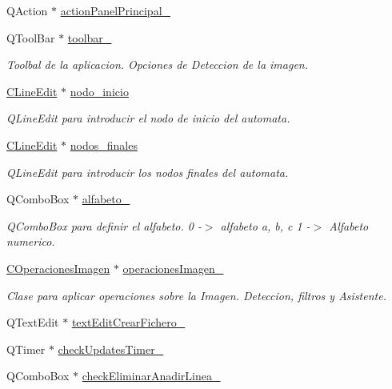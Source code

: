 \begin{DoxyCompactItemize}
Q\+Action $\ast$ \hyperlink{classCAplicacion_a081b2d079d037155bbc47106c109327e}{action\+Panel\+Principal\+\_\+}
\item 
Q\+Tool\+Bar $\ast$ \hyperlink{classCAplicacion_a2dca58bda4c34c0f76d8c95fcbba064c}{toolbar\+\_\+}
\begin{DoxyCompactList}\small\item\em Toolbal de la aplicacion. Opciones de Deteccion de la imagen. \end{DoxyCompactList}\item 
\hyperlink{classCLineEdit}{C\+Line\+Edit} $\ast$ \hyperlink{classCAplicacion_a9d3e345fc25efeaf8a160daf22206a8e}{nodo\+\_\+inicio}
\begin{DoxyCompactList}\small\item\em Q\+Line\+Edit para introducir el nodo de inicio del automata. \end{DoxyCompactList}\item 
\hyperlink{classCLineEdit}{C\+Line\+Edit} $\ast$ \hyperlink{classCAplicacion_a483026f954a5a26ddd9ded5863c61b9a}{nodos\+\_\+finales}
\begin{DoxyCompactList}\small\item\em Q\+Line\+Edit para introducir los nodos finales del automata. \end{DoxyCompactList}\item 
Q\+Combo\+Box $\ast$ \hyperlink{classCAplicacion_a2bc2fca932b919c027f2c4a35f837de0}{alfabeto\+\_\+}
\begin{DoxyCompactList}\small\item\em Q\+Combo\+Box para definir el alfabeto. 0 -\/$>$ alfabeto a, b, c 1 -\/$>$ Alfabeto numerico. \end{DoxyCompactList}\item 
\hyperlink{classCOperacionesImagen}{C\+Operaciones\+Imagen} $\ast$ \hyperlink{classCAplicacion_a58596bdd1d1e018bcb8bd58b64de538e}{operaciones\+Imagen\+\_\+}
\begin{DoxyCompactList}\small\item\em Clase para aplicar operaciones sobre la Imagen. Deteccion, filtros y Asistente. \end{DoxyCompactList}\item 
Q\+Text\+Edit $\ast$ \hyperlink{classCAplicacion_a7008254b5b6afad5cea2347df2d6c191}{text\+Edit\+Crear\+Fichero\+\_\+}
\item 
Q\+Timer $\ast$ \hyperlink{classCAplicacion_a812e5a85dd7d73bb4cce547962eb85f0}{check\+Updates\+Timer\+\_\+}
\item 
Q\+Combo\+Box $\ast$ \hyperlink{classCAplicacion_add0c84c5ecbc9f8a2949b8fe82f2c3cf}{check\+Eliminar\+Anadir\+Linea\+\_\+}

\end{DoxyCompactItemize}
